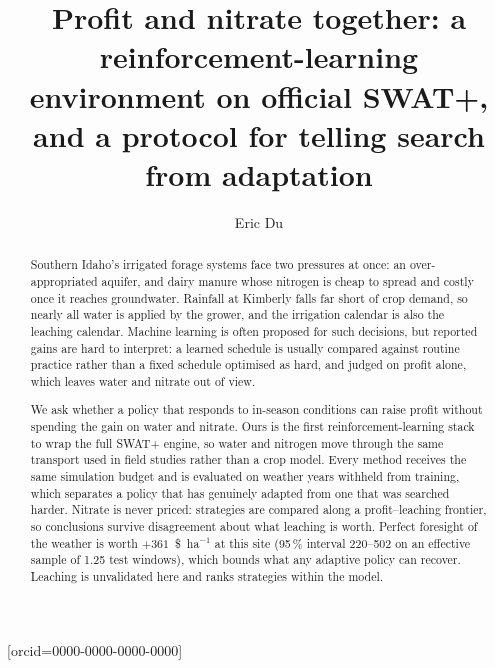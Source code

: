 \documentclass[a4paper,fleqn]{cas-sc}
\newcommand{\todo}[1]{\textcolor{BrickRed}{\textbf{[TODO:}~#1\textbf{]}}}
\begin{document}
\let\WriteBookmarks\relax
\def\floatpagepagefraction{1}
\def\textpagefraction{.001}


\title[mode=title]{Profit and nitrate together: a reinforcement-learning environment
on official SWAT+, and a protocol for telling search from adaptation}

\author[1]{Eric Du}[orcid=0000-0000-0000-0000]
\cormark[1]




\begin{abstract}
Southern Idaho's irrigated forage systems face two pressures at once: an
over-appropriated aquifer, and dairy manure whose nitrogen is cheap to spread and
costly once it reaches groundwater. Rainfall at Kimberly falls far short of crop
demand, so nearly all water is applied by the grower, and the irrigation calendar is
also the leaching calendar. Machine learning is often proposed for such decisions, but
reported gains are hard to interpret: a learned schedule is usually compared against
routine practice rather than a fixed schedule optimised as hard, and judged on profit
alone, which leaves water and nitrate out of view.

We ask whether a policy that responds to in-season conditions can raise profit without
spending the gain on water and nitrate. Ours is the first reinforcement-learning stack
to wrap the full SWAT+ engine, so water and nitrogen move through the same transport
used in field studies rather than a crop model. Every method receives the same
simulation budget and is evaluated on weather years withheld from training, which
separates a policy that has genuinely adapted from one that was searched harder.
Nitrate is never priced: strategies are compared along a profit--leaching frontier, so
conclusions survive disagreement about what leaching is worth.
Perfect foresight of the weather is worth $+361$~\$~ha$^{-1}$ at this site (95\,\% interval 220--502 on an effective sample of 1.25 test windows), which bounds what any adaptive policy can recover.
Leaching is unvalidated here and ranks strategies within the model.
\end{abstract}
\end{document}

